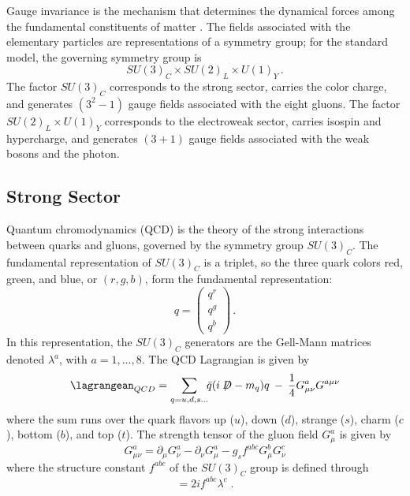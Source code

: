 Gauge invariance is the mechanism that determines the dynamical forces among the fundamental constituents of matter \cite{Pich:2012sx}. The fields associated with the elementary particles are representations of a symmetry group; for the standard model, the governing symmetry group is
\begin{equation}
SU(3)_C \times SU(2)_L \times U(1)_Y\,. \label{group}
\end{equation}
The factor $SU(3)_C$ corresponds to the strong sector, carries the color charge, and generates $(3^2-1)$ gauge fields associated with the eight gluons. The factor $SU(2)_L\times U(1)_Y$ corresponds to the electroweak sector, carries isospin and hypercharge, and generates $(3+1)$ gauge fields associated with the weak bosons and the photon.

\subsection{Strong Sector}
Quantum chromodynamics (QCD) is the theory of the strong interactions between quarks and gluons, governed by the symmetry group $SU(3)_C$. The fundamental representation of $SU(3)_C$ is a triplet, so the three quark colors red, green, and blue, or $(r, g, b)$, form the fundamental representation:
\begin{equation}
q = \left(\begin{array}{c} q^r\\ q^g\\ q^b \end{array} \right)\,.
\end{equation}
In this representation, the $SU(3)_C$ generators are the Gell-Mann matrices denoted $\lambda^a$, with $a=1,\ldots ,8$. The QCD Lagrangian is given by
\begin{equation}
\lagrangean_{QCD}=\sum_{q=u,d,s\ldots}\!\!\bar{q}(i\not\!\!D - m_q)q \: - \: \frac{1}{4}G_{\mu\nu}^a G^{a\mu\nu}
\label{Lqcd}
\end{equation}
where the sum runs over the quark flavors up ($u$), down ($d$), strange ($s$), charm ($c$), bottom ($b$), and top ($t$). The strength tensor of the gluon field $G_\mu^a$ is given by
\begin{equation}
G_{\mu\nu}^a = \partial_\mu G_\nu^a-\partial_\nu G_\mu^a-g_s f^{abc}G_\mu^bG_\nu^c
\end{equation}
where the structure constant $f^{abc}$ of the $SU(3)_C$ group is defined through 
\begin{equation}
[\lambda^a,\lambda^b]=2if^{abc}\lambda^c \; . 
\end{equation}

